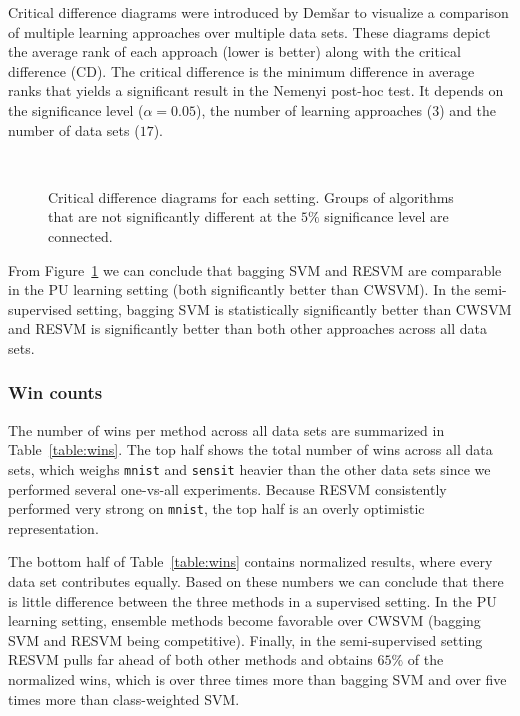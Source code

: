 Critical difference diagrams were introduced by Dem{\v{s}}ar \citep{demvsar2006statistical} to visualize a comparison of multiple learning approaches over multiple data sets. These diagrams depict the average rank of each approach (lower is better) along with the critical difference (CD). The critical difference is the minimum difference in average ranks that yields a significant result in the Nemenyi post-hoc test. It depends on the significance level ($\alpha=0.05$), the number of learning approaches ($3$) and the number of data sets ($17$). 

\begin{figure}%
\centering
{}\hfill
{}\\
\hfill
  \caption{Critical difference diagrams for each setting. %
      Groups of algorithms that are not significantly different at the $5\%$ significance level are connected.}%
  \label{fig:cds}
\end{figure}

From Figure~\ref{fig:cds} we can conclude that bagging SVM and RESVM are comparable in the PU learning setting (both significantly better than CWSVM). In the semi-supervised setting, bagging SVM is statistically significantly better than CWSVM and RESVM is significantly better than both other approaches across all data sets.

\subsubsection{Win counts} \label{wins}
The number of wins per method across all data sets are summarized in Table~\ref{table:wins}. The top half shows the total number of wins across all data sets, which weighs \texttt{mnist} and \texttt{sensit} heavier than the other data sets since we performed several one-vs-all experiments. Because RESVM consistently performed very strong on \texttt{mnist}, the top half is an overly optimistic representation.

The bottom half of Table~\ref{table:wins} contains normalized results, where every data set contributes equally. Based on these numbers we can conclude that there is little difference between the three methods in a supervised setting. In the PU learning setting, ensemble methods become favorable over CWSVM (bagging SVM and RESVM being competitive). Finally, in the semi-supervised setting RESVM pulls far ahead of both other methods and obtains $65\%$ of the normalized wins, which is over three times more than bagging SVM and over five times more than class-weighted SVM.

